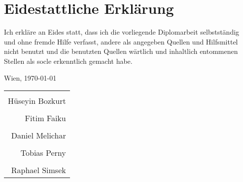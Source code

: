 \section*{Eidestattliche Erklärung}
Ich erkläre an Eides statt, dass ich die vorliegende Diplomarbeit selbstständig und ohne fremde Hilfe verfasst, andere als angegeben Quellen und Hilfsmittel nicht benutzt und die benutzten Quellen wärtlich und inhaltlich entommenen Stellen als socle erkenntlich gemacht habe.

\vspace{0.5cm}

Wien, \today

\vspace{1.5cm}

\begin{flushright}
	\begin{tabular}{r}
	 \makebox[2.5in]{\hrulefill}\\
	 Hüseyin Bozkurt\\[8ex]
	 \makebox[2.5in]{\hrulefill}\\
	 Fitim Faiku\\[8ex]
	 \makebox[2.5in]{\hrulefill}\\
	 Daniel Melichar\\[8ex]
	 \makebox[2.5in]{\hrulefill}\\
	 Tobias Perny\\[8ex]
	 \makebox[2.5in]{\hrulefill}\\
	 Raphael Simsek\\[8ex]
	\end{tabular}
\end{flushright}